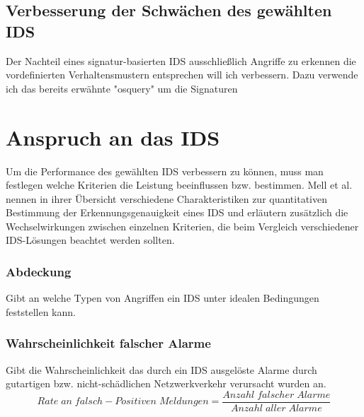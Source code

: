 \subsection{Verbesserung der Schwächen des gewählten IDS}
Der Nachteil eines signatur-basierten IDS ausschließlich Angriffe zu erkennen die vordefinierten Verhaltensmustern entsprechen will ich verbessern. Dazu verwende ich das bereits erwähnte "osquery" um die Signaturen 

\section{Anspruch an das IDS}
Um die Performance des gewählten IDS verbessern zu können, muss man festlegen welche Kriterien die Leistung beeinflussen bzw. bestimmen.
Mell et al.\cite{mell2003overview} nennen in ihrer Übersicht verschiedene Charakteristiken zur quantitativen Bestimmung der Erkennungsgenauigkeit eines IDS und erläutern zusätzlich die Wechselwirkungen zwischen einzelnen Kriterien, die beim Vergleich verschiedener IDS-Lösungen beachtet werden sollten.
\subsubsection{Abdeckung}
Gibt an welche Typen von Angriffen ein IDS unter idealen Bedingungen feststellen kann.
\subsubsection{Wahrscheinlichkeit falscher Alarme}
Gibt die Wahrscheinlichkeit das durch ein IDS ausgelöste Alarme durch gutartigen bzw. nicht-schädlichen Netzwerkverkehr verursacht wurden an.\\
\[Rate\;an\;falsch-Positiven\;Meldungen = \frac{Anzahl\;falscher\;Alarme}{Anzahl\;aller\;Alarme}\]

